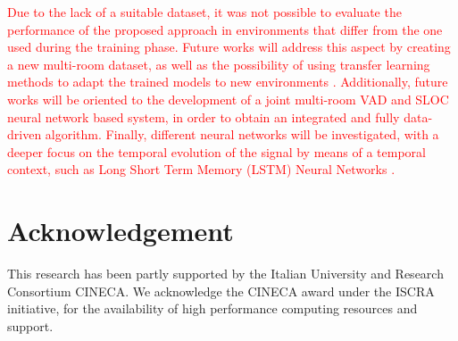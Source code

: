\documentclass[review]{elsarticle}
\begin{document}
\textcolor{red}{
Due to the lack of a suitable dataset, it was not possible to evaluate the performance of the proposed approach in environments that differ from the one used during the training phase. Future works will address this aspect by creating a new multi-room dataset, as well as the possibility of using transfer learning methods to adapt the trained models to new environments \cite{Pan2010}. Additionally, future works will be oriented to the development of a joint multi-room VAD \cite{ijcnn-vad,ijcnn2016-vad} and SLOC neural network based system, in order to obtain an integrated and fully data-driven algorithm. Finally, different neural networks will be investigated, with a deeper focus on the temporal evolution of the signal by means of a temporal context, such as Long Short Term Memory (LSTM) Neural Networks \cite{hochreiter1997long}.}

\section*{Acknowledgement}
This research has been partly supported by the Italian University and Research Consortium CINECA. We acknowledge the CINECA award under the ISCRA initiative, for the availability of high performance computing resources and support.












\end{document}

